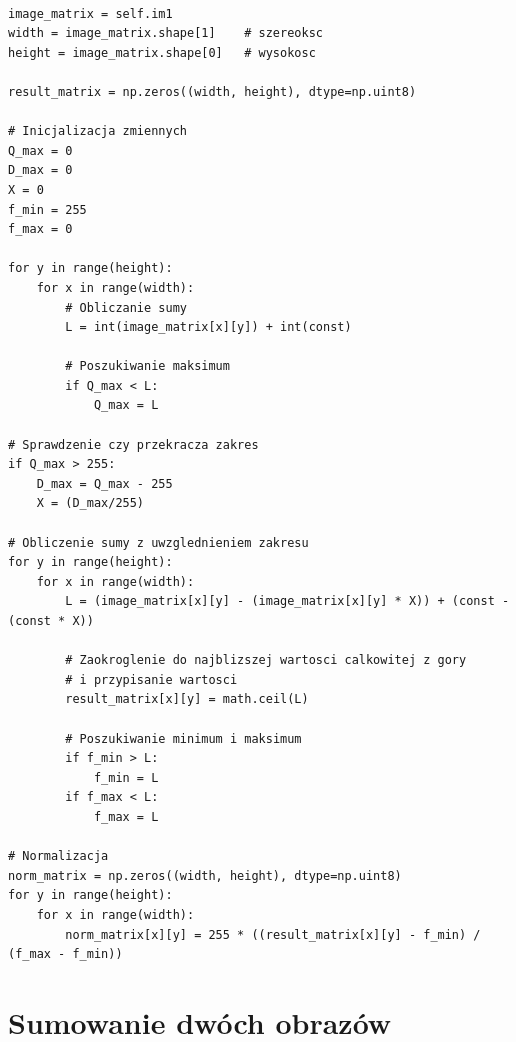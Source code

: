 \documentclass[final,a4paper,openany,12pt]{mwbk}
\begin{document}
\begin{lstlisting}[caption=Sumowanie obrazu szarego ze stałą]

image_matrix = self.im1
width = image_matrix.shape[1]    # szereoksc
height = image_matrix.shape[0]   # wysokosc

result_matrix = np.zeros((width, height), dtype=np.uint8)

# Inicjalizacja zmiennych
Q_max = 0
D_max = 0
X = 0
f_min = 255
f_max = 0

for y in range(height):
    for x in range(width):  
        # Obliczanie sumy
        L = int(image_matrix[x][y]) + int(const)

        # Poszukiwanie maksimum
        if Q_max < L:
            Q_max = L

# Sprawdzenie czy przekracza zakres
if Q_max > 255:
    D_max = Q_max - 255
    X = (D_max/255)

# Obliczenie sumy z uwzglednieniem zakresu
for y in range(height):
    for x in range(width): 
        L = (image_matrix[x][y] - (image_matrix[x][y] * X)) + (const - (const * X))

        # Zaokroglenie do najblizszej wartosci calkowitej z gory
        # i przypisanie wartosci
        result_matrix[x][y] = math.ceil(L)

        # Poszukiwanie minimum i maksimum
        if f_min > L:
            f_min = L
        if f_max < L:
            f_max = L

# Normalizacja
norm_matrix = np.zeros((width, height), dtype=np.uint8)
for y in range(height):
    for x in range(width):
        norm_matrix[x][y] = 255 * ((result_matrix[x][y] - f_min) / (f_max - f_min))

\end{lstlisting}



\section {Sumowanie dwóch obrazów}
\hfill
\\\\
\indent
\end{document}
